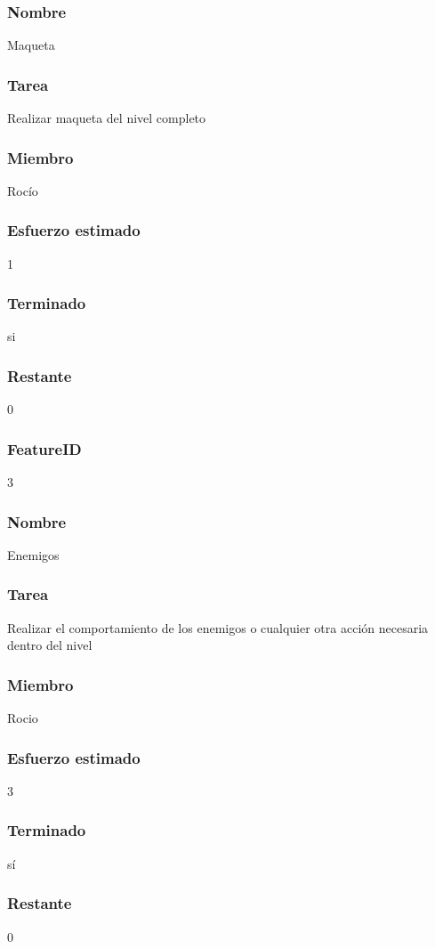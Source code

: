 \subsubsection{Nombre}Maqueta
\subsubsection{Tarea}Realizar maqueta del nivel completo
\subsubsection{Miembro}Rocío
\subsubsection{Esfuerzo estimado}1
\subsubsection{Terminado}si
\subsubsection{Restante}0


\subsubsection{FeatureID} 3
\subsubsection{Nombre} Enemigos
\subsubsection{Tarea} Realizar el comportamiento de los enemigos o cualquier otra acción necesaria dentro del nivel
\subsubsection{Miembro} Rocio
\subsubsection{Esfuerzo estimado} 3
\subsubsection{Terminado} sí
\subsubsection{Restante} 0


